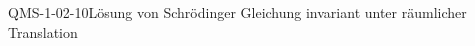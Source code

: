 
\begin{CONC}{QMS-1-02-10}{Lösung von Schrödinger Gleichung invariant unter räumlicher Translation}
\end{CONC}
